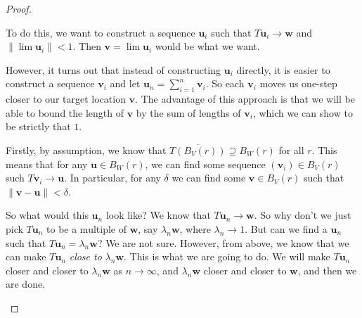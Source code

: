 \documentclass[a4paper]{article}
\begin{document}
\begin{proof}
\begin{enumerate}
      To do this, we want to construct a sequence $\mathbf{u}_i$ such that $T\mathbf{u}_i \to \mathbf{w}$ and $\|\lim \mathbf{u}_i\| < 1$. Then $\mathbf{v} = \lim \mathbf{u}_i$ would be what we want.

      However, it turns out that instead of constructing $\mathbf{u}_i$ directly, it is easier to construct a sequence $\mathbf{v}_i$ and let $\mathbf{u}_n = \sum_{i = 1}^n \mathbf{v}_i$. So each $\mathbf{v}_i$ moves us one-step closer to our target location $\mathbf{v}$. The advantage of this approach is that we will be able to bound the length of $\mathbf{v}$ by the sum of lengths of $\mathbf{v}_i$, which we can show to be strictly that $1$.

      Firstly, by assumption, we know that $\overline{T(B_V(r))} \supseteq B_W(r)$ for all $r$. This means that for any $\mathbf{u}\in B_W(r)$, we can find some sequence $(\mathbf{v}_i)\in B_V(r)$ such $T\mathbf{v}_i \to \mathbf{u}$. In particular, for any $\delta$ we can find some $\mathbf{v}\in B_V(r)$ such that $\|\mathbf{v} - \mathbf{u}\| < \delta$.

      So what would this $\mathbf{u}_n$ look like? We know that $T\mathbf{u}_n \to \mathbf{w}$. So why don't we just pick $T\mathbf{u}_n$ to be a multiple of $\mathbf{w}$, say $\lambda_n \mathbf{w}$, where $\lambda_n \to 1$. But can we find a $\mathbf{u}_n$ such that $T\mathbf{u}_n = \lambda_n \mathbf{w}$? We are not sure. However, from above, we know that we can make $T\mathbf{u}_n$ \emph{close to} $\lambda_n \mathbf{w}$. This is what we are going to do. We will make $T\mathbf{u}_n$ closer and closer to $\lambda_n \mathbf{w}$ as $n \to \infty$, and $\lambda_n \mathbf{w}$ closer and closer to $\mathbf{w}$, and then we are done.


\end{enumerate}
\end{proof}
\end{document}
